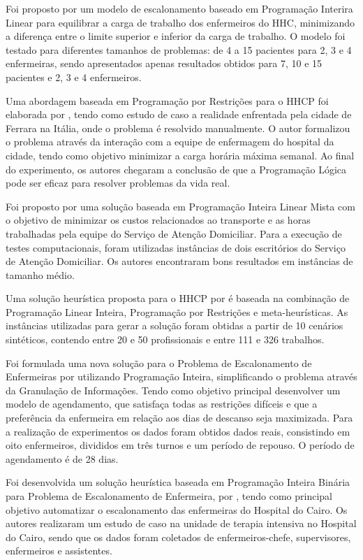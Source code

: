 Foi proposto por  \cite{trabelsi:2012} um modelo de escalonamento baseado em Programação Interira Linear para  equilibrar a carga de trabalho dos enfermeiros do \ac{HHC},  minimizando a diferença entre o limite superior e inferior da carga de trabalho. O modelo foi testado para diferentes tamanhos de problemas: de 4 a 15 pacientes para 2, 3 e 4 enfermeiras, sendo apresentados apenas resultados obtidos para 7, 10 e 15 pacientes e 2, 3 e 4 enfermeiros.

Uma abordagem baseada em Programação por Restrições para o \ac{HHCP} foi elaborada por \cite{cattafi:2012}, tendo como estudo de caso a realidade enfrentada pela cidade de Ferrara na Itália, onde o problema é resolvido manualmente. O autor formalizou o problema através da interação com a equipe de enfermagem do hospital da cidade, tendo como objetivo minimizar a carga horária máxima semanal. Ao final do experimento, os autores chegaram a conclusão de que a Programação Lógica pode ser eficaz para resolver problemas da vida real.

Foi proposto por \cite{Decerle:2016} uma solução baseada em Programação Inteira Linear Mista com o objetivo de minimizar os custos relacionados ao transporte e as horas trabalhadas pela equipe do Serviço de Atenção Domiciliar. Para a execução de testes computacionais, foram utilizadas instâncias de dois escritórios do Serviço de Atenção Domiciliar. Os autores encontraram bons resultados em instâncias de tamanho médio.

Uma solução heurística proposta para o \ac{HHCP} por \cite{Bertels:2006} é baseada na combinação de Programação Linear Inteira, Programação por Restrições e meta-heurísticas. As instâncias utilizadas para gerar a solução foram obtidas a partir de 10 cenários sintéticos, contendo entre 20 e 50 profissionais e entre 111 e 326 trabalhos.

Foi formulada uma nova solução para o Problema de Escalonamento de Enfermeiras por \cite{baskaran:2014} utilizando Programação Inteira, simplificando o problema através da Granulação de Informações. Tendo como objetivo principal desenvolver um modelo de agendamento, que satisfaça todas as restrições difíceis e que a preferência da enfermeira em relação aos dias de descanso seja maximizada. Para a realização de experimentos os dados foram obtidos dados reais, consistindo em oito enfermeiros, divididos em três turnos e um período de repouso. O período de agendamento é de 28 dias.

Foi desenvolvida um solução heurística baseada em Programação Inteira Binária para Problema de Escalonamento de Enfermeira, por \cite{Zen-El-Din:2012}, tendo como principal objetivo automatizar o escalonamento das enfermeiras do Hospital do Cairo. Os autores realizaram um estudo de caso  na unidade de terapia intensiva no Hospital do Cairo, sendo que os dados foram coletados de enfermeiros-chefe, supervisores, enfermeiros e assistentes.

